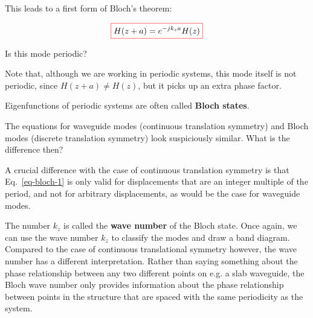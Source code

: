 This leads to a first form of Bloch's theorem:

\begin{equation}
\fbox{$\displaystyle  
  H(z + a) = e^{-j k_z a} H(z) \label{eq-bloch-1}
  $}
\end{equation} 

\begin{cue}
Is this mode periodic?
\end{cue}

Note that, although we are working in periodic systems, this mode itself is not periodic, since $H(z + a) \ne H(z)$, but it picks up an extra phase factor.

Eigenfunctions of periodic systems are often called \textbf{Bloch states}.

\begin{cue}
  The equations for waveguide modes (continuous translation symmetry) and Bloch modes (discrete translation symmetry) look suspiciously similar. What is the difference then?
\end{cue}

A crucial difference with the case of continuous translation symmetry is that Eq.~\ref{eq-bloch-1} is only valid for displacements that are an integer multiple of the period, and not for arbitrary displacements, as would be the case for waveguide modes.
 
The number $k_z$ is called the \textbf{wave number} of the Bloch state. Once again, we can use the wave number $k_z$ to classify the modes and draw a band diagram. Compared to the case of continuous translational symmetry however, the wave number has a different interpretation. Rather than saying something about the phase relationship between any two different points on e.g. a slab waveguide, the Bloch wave number only provides information about the phase relationship between points in the structure that are spaced with the same periodicity as the system.


\pagebreak



